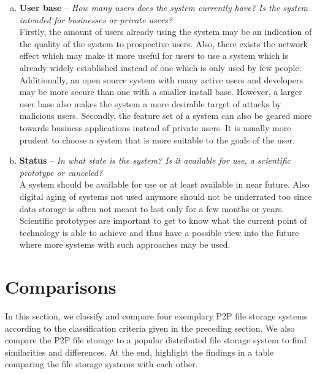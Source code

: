 \begin{enumerate}[(a)]
\item \textbf{User base} -- \textit{How many users does the system currently have? Is the system intended for businesses or private users?}\\
Firstly, the amount of users already using the system may be an indication of the quality of the system to prospective users. Also, there exists the network effect which may make it more useful for users to use a system which is already widely established instead of one which is only used by few people. Additionally, an open source system with many active users and developers may be more secure than one with a smaller install base. However, a larger user base also makes the system a more desirable target of attacks by malicious users. Secondly, the feature set of a system can also be geared more towards business applications instead of private users. It is usually more prudent to choose a system that is more suitable to the goals of the user.

\item \textbf{Status} -- \textit{In what state is the system? Is it available for use, a scientific prototype or canceled?}\\
A system should be available for use or at least available in near future. Also digital aging of systems not used anymore should not be underrated too since data storage is often not meant to last only for a few months or years. Scientific prototypes are important to get to know what the current point of technology is able to achieve and thus have a possible view into the future where more systems with such approaches may be used.
\end{enumerate}

\section{Comparisons}
\label{comparisons}
In this section, we classify and compare four exemplary P2P file storage systems according to the classification criteria given in the preceding section. We also compare the P2P file storage to a popular distributed file storage system to find similarities and differences. At the end, highlight the findings in a table comparing the file storage systems with each other.

